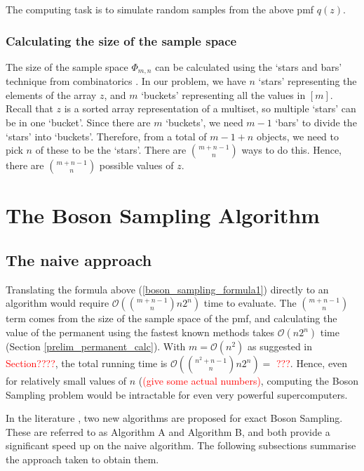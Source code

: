 \documentclass[11pt]{article}
\theoremstyle{theorem}
\theoremstyle{remark}
\theoremstyle{plain}
\theoremstyle{definition}
\begin{document}
The computing task is to simulate random samples from the above pmf $q(z)$.
\subsubsection{Calculating the size of the sample space}
The size of the sample space $ \Phi_{m,n}$ can be calculated using the `stars and bars' technique from combinatorics \cite{feller1968}. In our problem, we have $n$ `stars' representing the elements of the array $z$, and $m$ `buckets' representing all the values in $[m]$. Recall that $z$ is a sorted array representation of a multiset, so multiple `stars' can be in one `bucket'. Since there are $m$ `buckets', we need $m-1$ `bars' to divide the `stars' into `buckets'. Therefore, from a total of $m-1 + n$ objects, we need to pick $n$ of these to be the `stars'. There are $\binom{m+n-1}{n}$ ways to do this. Hence, there are $\binom{m+n-1}{n}$ possible values of $z$.

\section{The Boson Sampling Algorithm}
\subsection{The naive approach}
Translating the formula above (\ref{boson_sampling_formula1}) directly to an algorithm would require $\mathcal{O}(\binom{m+n-1}{n} n 2^n)$ time to evaluate. The $\binom{m+n-1}{n}$ term comes from the size of the sample space of the pmf, and calculating the value of the permanent using the fastest known methods takes $\mathcal{O}(n 2^n)$ time (Section \ref{prelim_permanent_calc}). With $m = \mathcal{O}(n^2)$ as suggested in \textcolor{red}{Section????}, the total running time is $\mathcal{O}(\binom{n^2+n-1}{n} n 2^n) = $ \textcolor{red}{???}. Hence, even for relatively small values of $n$ (\textcolor{red}{(give some actual numbers)}, computing the Boson Sampling problem would be intractable for even very powerful supercomputers.

In the literature \cite{clifford17}, two new algorithms are proposed for exact Boson Sampling. These are referred to as Algorithm A and Algorithm B, and both provide a significant speed up on the naive algorithm. The following subsections summarise the approach taken to obtain them.
\end{document}
